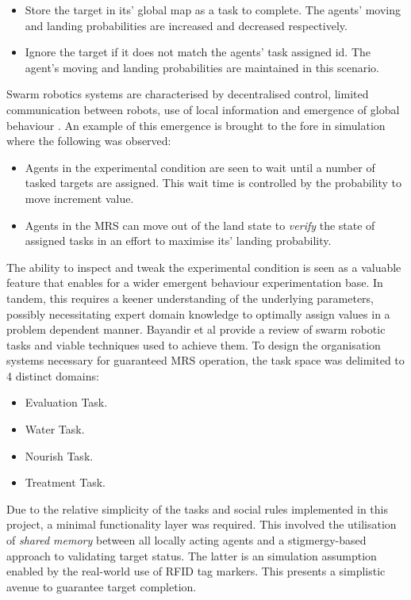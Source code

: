 \documentclass{report}
\begin{document}
\begin{itemize}
	\item Store the target in its' global map as a task to complete. The agents' moving and landing probabilities are increased and decreased respectively.
	\item Ignore the target if it does not match the agents' task assigned id. The agent's moving and landing probabilities are maintained in this scenario.
\end{itemize}

Swarm robotics systems are characterised by decentralised control, limited communication between robots, use of local information and emergence of global behaviour \cite{Dorigo2013}. An example of this emergence is brought to the fore in simulation where the following was observed:
\begin{itemize}
	\item Agents in the experimental condition are seen to wait until a number of tasked targets are assigned. This wait time is controlled by the probability to move increment value.
	\item Agents in the MRS can move out of the land state to \textit{verify} the state of assigned tasks in an effort to maximise its' landing probability.
\end{itemize}

The ability to inspect and tweak the experimental condition is seen as a valuable feature that enables for a wider emergent behaviour experimentation base. In tandem, this requires a keener understanding of the underlying parameters, possibly necessitating expert domain knowledge to optimally assign values in a problem dependent manner. Bayandir et al \cite{Bayindir2016} provide a review of swarm robotic tasks and viable techniques used to achieve them. To design the organisation systems necessary for guaranteed MRS operation, the task space was delimited to 4 distinct domains:
\begin{itemize}
	\item Evaluation Task.
	\item Water Task.
	\item Nourish Task.
	\item Treatment Task.
\end{itemize}

Due to the relative simplicity of the tasks and social rules implemented in this project, a minimal functionality layer was required. This involved the utilisation of \textit{shared memory} between all locally acting agents and a stigmergy-based approach to validating target status. The latter is an simulation assumption enabled by the real-world use of RFID tag markers. This presents a simplistic avenue to guarantee target completion.
\end{document}
